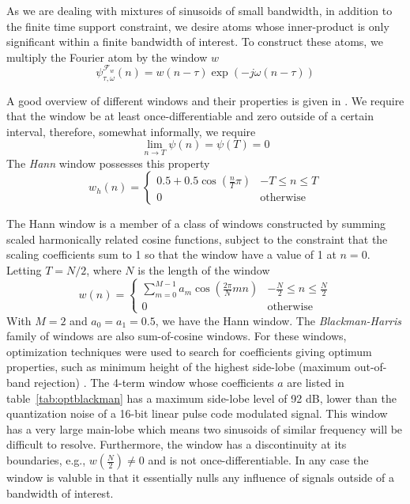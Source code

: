\documentclass[letterpaper,12pt]{report}
\begin{document}
As we are dealing with mixtures of sinusoids of small bandwidth, in addition to
the finite time support constraint, we desire atoms whose inner-product is only
significant within a finite bandwidth of interest. To construct these atoms, we
multiply the Fourier atom by the window $w$
\[
    \psi_{\tau,\omega}^{\mathcal{F}_{w}}(n) = w(n-\tau) \exp(-j\omega(n-\tau))
\]

A good overview of different windows and their properties is given in
\cite{harris1978use}. We require that the window be at least
once-differentiable and zero outside of a certain interval, therefore, somewhat
informally, we require
\[
    \lim_{n \rightarrow T} \psi(n) = \psi(T) = 0
\]
The \textit{Hann} window possesses this property
\[
    w_{h}(n) = \begin{cases}
        0.5 + 0.5 \cos \left( \frac{n}{T}\pi \right) & -T \leq n \leq T \\
        0 & \text{otherwise}
    \end{cases}
\]

The Hann window is a member of a class of windows constructed by summing scaled
harmonically related cosine functions, subject to the constraint that the
scaling coefficients sum to 1 so that the window have a value of 1 at $n=0$.
Letting $T=N/2$, where $N$ is the length of the window
\[
    w(n) = \begin{cases}
        \sum_{m=0}^{M-1}a_{m}\cos \left( \frac{2\pi}{N}mn \right) & -\frac{N}{2} \leq n
        \leq \frac{N}{2} \\
        0 & \text{otherwise}
    \end{cases}
\]
With $M=2$ and $a_0 = a_1 = 0.5$, we have the Hann window. The
\textit{Blackman-Harris} family of windows are also sum-of-cosine windows. For
these windows, optimization techniques were used to search for coefficients
giving optimum properties, such as minimum height of the highest side-lobe
(maximum out-of-band rejection) \cite{rabiner1970approach}. The 4-term window
whose coefficients $a$ are listed in table~\ref{tab:optblackman} has a maximum
side-lobe level of 92 dB, lower than the quantization noise of a 16-bit linear
pulse code modulated signal. This window has a very large main-lobe which means
two sinusoids of similar frequency will be difficult to resolve. Furthermore,
the window has a discontinuity at its boundaries, e.g.,
$w \left( \frac{N}{2} \right) \neq 0$ and is not once-differentiable. In any
case the window is valuble in that it essentially nulls any influence of signals
outside of a bandwidth of interest.
\end{document}

